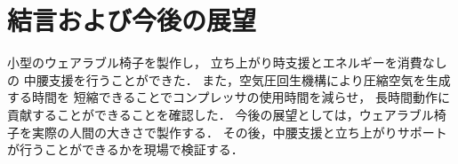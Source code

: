 \section{結言および今後の展望}
小型のウェアラブル椅子を製作し，
立ち上がり時支援とエネルギーを消費なしの
中腰支援を行うことができた．
また，空気圧回生機構により圧縮空気を生成する時間を
短縮できることでコンプレッサの使用時間を減らせ，
長時間動作に貢献することができることを確認した．
今後の展望としては，ウェアラブル椅子を実際の人間の大きさで製作する．
その後，中腰支援と立ち上がりサポートが行うことができるかを現場で検証する．